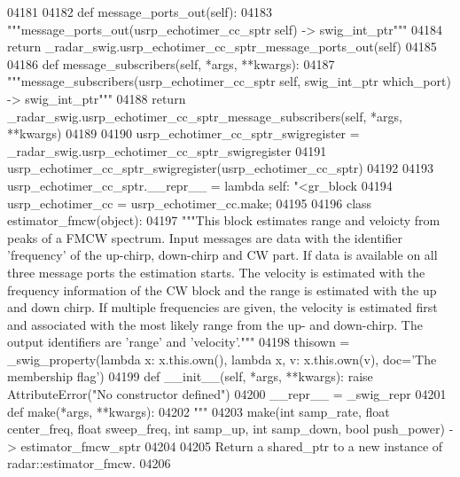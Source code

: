 \begin{DoxyCode}
{{{{{{{{{{{{{{04181 
04182     \textcolor{keyword}{def }message_ports_out(self):
04183         \textcolor{stringliteral}{"""message\_ports\_out(usrp\_echotimer\_cc\_sptr self) -> swig\_int\_ptr"""}
04184         \textcolor{keywordflow}{return} \_radar\_swig.usrp\_echotimer\_cc\_sptr\_message\_ports\_out(self)
04185 
04186     \textcolor{keyword}{def }message_subscribers(self, *args, **kwargs):
04187         \textcolor{stringliteral}{"""message\_subscribers(usrp\_echotimer\_cc\_sptr self, swig\_int\_ptr which\_port) -> swig\_int\_ptr"""}
04188         \textcolor{keywordflow}{return} \_radar\_swig.usrp\_echotimer\_cc\_sptr\_message\_subscribers(self, *args, **kwargs)
04189 
04190 usrp\_echotimer\_cc\_sptr\_swigregister = \_radar\_swig.usrp\_echotimer\_cc\_sptr\_swigregister
04191 usrp_echotimer_cc_sptr_swigregister(usrp\_echotimer\_cc\_sptr)
04192 
04193 usrp\_echotimer\_cc\_sptr.\_\_repr\_\_ = \textcolor{keyword}{lambda} self: \textcolor{stringliteral}{"<gr\_block %
04194 usrp\_echotimer\_cc = usrp\_echotimer\_cc.make;
04195 
04196 \textcolor{keyword}{class }estimator_fmcw(object):
04197     \textcolor{stringliteral}{"""This block estimates range and veloicty from peaks of a FMCW spectrum. Input messages are data with
       the identifier 'frequency' of the up-chirp, down-chirp and CW part. If data is available on all three
       message ports the estimation starts. The velocity is estimated with the frequency information of the CW block and
       the range is estimated with the up and down chirp. If multiple frequencies are given, the velocity is
       estimated first and associated with the most likely range from the up- and down-chirp. The output identifiers are 
      'range' and 'velocity'."""}
04198     thisown = _swig_property(\textcolor{keyword}{lambda} x: x.this.own(), \textcolor{keyword}{lambda} x, v: x.this.own(v), doc=\textcolor{stringliteral}{'The membership flag'})
04199     \textcolor{keyword}{def }__init__(self, *args, **kwargs): \textcolor{keywordflow}{raise} AttributeError(\textcolor{stringliteral}{"No constructor defined"})
04200     \_\_repr\_\_ = \_swig\_repr
04201     \textcolor{keyword}{def }make(*args, **kwargs):
04202         \textcolor{stringliteral}{"""}
04203 \textcolor{stringliteral}{        make(int samp\_rate, float center\_freq, float sweep\_freq, int samp\_up, int samp\_down, bool
       push\_power) -> estimator\_fmcw\_sptr}
04204 \textcolor{stringliteral}{}
04205 \textcolor{stringliteral}{        Return a shared\_ptr to a new instance of radar::estimator\_fmcw.}
04206 \textcolor{stringliteral}{}
}}}}}}}}}}}}}}}
\end{DoxyCode}
